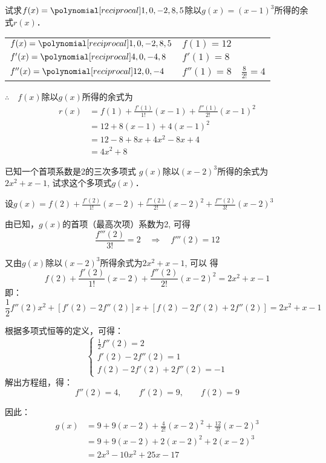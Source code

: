     \begin{example}
试求$f(x)=\poly{1,0,-2,8,5}$除以$g(x)=(x-1)^3$所得的余式$r(x)$．
    \end{example}    
    
    \begin{solution}
\begin{center}
\begin{tabular}{lll}
$f(x)=\poly{1,0,-2,8,5}$  &  $f(1)=12$  \\
$f'(x)=\poly{4,0,-4,8}$  &  $f'(1)=8$  \\
$f''(x)=\poly{12,0,-4}$  &  $f''(1)=8$& $\frac{8}{2!}=4$  \\
\end{tabular}    
\end{center}
          
$\therefore\quad f(x)$除以$g(x)$所得的余式为
\[\begin{split}
    r(x)&=f(1)+\frac{f'(1)}{1!}(x-1)+\frac{f''(1)}{2!}(x-1)^2\\
    &=12+8(x-1)+4(x-1)^2\\
    &=12-8+8x+4x^2-8x+4\\
    &=4x^2+8
\end{split}\]
    \end{solution}

    \begin{example}
已知一个首项系数是2的三次多项式 $g(x)$除以$(x-2)^3$所得的余式为$2x^2+x-1$, 试求这个多项式$g(x)$．
    \end{example}    
    
    \begin{solution}
设$g(x)=f(2)+\frac{f'(2)}{1!}(x-2)+\frac{f''(2)}{2!}(x-2)^2+\frac{f'''(2)}{3!}(x-2)^3$

由已知，$g(x)$的首项（最高次项）系数为2, 可得
\[\frac{f'''(2)}{3!}=2\quad \Rightarrow\quad f'''(2)=12\]

又由$g(x)$除以$(x-2)^3$所得余式为$2x^2+x-1$, 可以
得       
\[f(2)+\frac{f'(2)}{1!}(x-2)+\frac{f''(2)}{2!}(x-2)^2=2x^2+x-1\]
即：
\[\frac{1}{2}f''(2)x^2+[f'(2)-2f''(2)]x+[f(2)-2f'(2)+2f''(2)]=2x^2+x-1\]
 
根据多项式恒等的定义，可得：
\[\begin{cases}
    \frac{1}{2}f''(2)=2\\
    f'(2)-2f''(2)=1\\
    f(2)-2f'(2)+2f''(2)=-1
\end{cases}\]
解出方程组，得：
\[f''(2)=4,\qquad f'(2)=9,\qquad f(2)=9\]

因此：
\[\begin{split}
    g(x)&=9+9(x-2)+\frac{4}{2!}(x-2)^2+\frac{12}{3!}(x-2)^3\\
    &=9+9(x-2)+2(x-2)^2+2(x-2)^3\\
    &=2x^3-10x^2+25x-17
\end{split}\]
   \end{solution}


